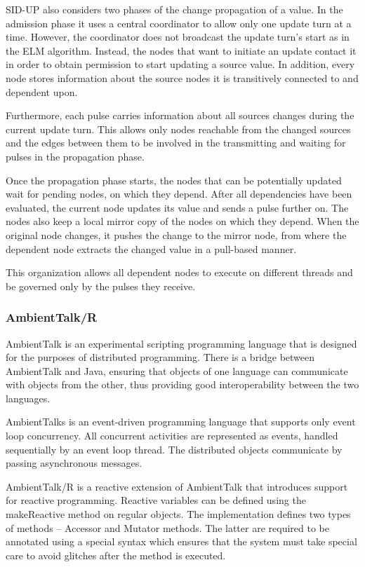 \documentclass{sigplanconf}
\begin{document}
SID-UP also considers two phases of the change propagation of a value. In the admission phase it uses a central coordinator to allow only one update turn at a time. However, the coordinator does not broadcast the update turn's start as in the ELM algorithm. Instead, the nodes that want to initiate an update contact it in order to obtain permission to start updating a source value. In addition, every node stores information about the source nodes it is transitively connected to and dependent upon.

Furthermore, each pulse carries information about all sources changes during the current update turn. This allows only nodes reachable from the changed sources and the edges between them to be involved in the transmitting and waiting for pulses in the propagation phase.

Once the propagation phase starts, the nodes that can be potentially updated wait for pending nodes, on which they depend. After all dependencies have been evaluated, the current node updates its value and sends a pulse further on. The nodes also keep a local mirror copy of the nodes on which they depend. When the original node changes, it pushes the change to the mirror node, from where the dependent node extracts the changed value in a pull-based manner.

This organization allows all dependent nodes to execute on different threads and be governed only by the pulses they receive.

\subsubsection{AmbientTalk/R}
AmbientTalk \cite{loosely} is an experimental scripting programming language that is designed for the purposes of distributed programming. There is a bridge between AmbientTalk and Java, ensuring that objects of one language can communicate with objects from the other, thus providing good interoperability between the two languages.

AmbientTalks is an event-driven programming language that supports only event loop concurrency. All concurrent activities are represented as events, handled sequentially by an event loop thread. The distributed objects communicate by passing asynchronous messages.

AmbientTalk/R is a reactive extension of AmbientTalk that introduces support for reactive programming. Reactive variables can be defined using the makeReactive method on regular objects. The implementation defines two types of methods – Accessor and Mutator methods. The latter are required to be annotated using a special syntax which ensures that the system must take special care to avoid glitches after the method is executed.
\end{document}
